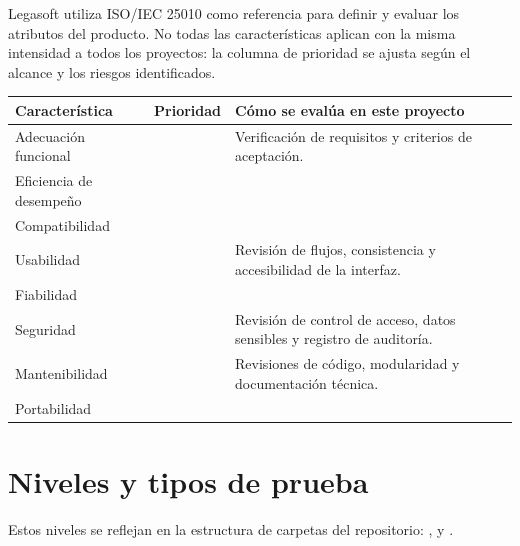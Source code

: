 \documentclass[11pt,a4paper]{article}
\begin{document}
Legasoft utiliza ISO/IEC 25010 como referencia para definir y evaluar los
atributos del producto. No todas las características aplican con la misma
intensidad a todos los proyectos: la columna de prioridad se ajusta según el
alcance y los riesgos identificados.

\begin{center}
\begin{tabularx}{\linewidth}{@{}L{4.0cm} C{2.0cm} Y@{}}
\toprule
\sffamily\bfseries\color{lgPrimario}Característica &
\sffamily\bfseries\color{lgPrimario}Prioridad &
\sffamily\bfseries\color{lgPrimario}Cómo se evalúa en este proyecto \\
\midrule
Adecuación funcional    &  & Verificación de requisitos y criterios de aceptación. \\
Eficiencia de desempeño &  &  \\
Compatibilidad          &  &  \\
Usabilidad              &  & Revisión de flujos, consistencia y accesibilidad de la interfaz. \\
Fiabilidad              &  &  \\
Seguridad               &  & Revisión de control de acceso, datos sensibles y registro de auditoría. \\
Mantenibilidad          &  & Revisiones de código, modularidad y documentación técnica. \\
Portabilidad            &  &  \\
\bottomrule
\end{tabularx}
\end{center}

\section{Niveles y tipos de prueba}

Estos niveles se reflejan en la estructura de carpetas del repositorio:
,  y .
\end{document}
